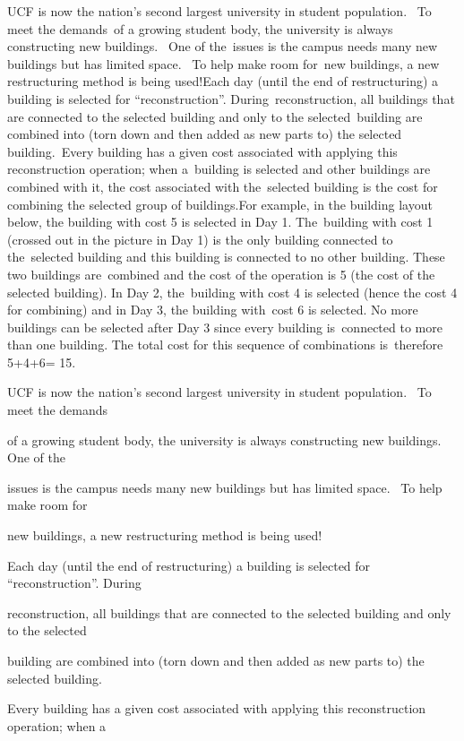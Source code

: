 UCF is now the nation’s second largest university in student population.  To meet the demands of a growing student body, the university is always constructing new buildings.  One of the issues is the campus needs many new buildings but has limited space.  To help make room for new buildings, a new restructuring method is being used!Each day (until the end of restructuring) a building is selected for “reconstruction”. During reconstruction, all buildings that are connected to the selected building and only to the selected building are combined into (torn down and then added as new parts to) the selected building. Every building has a given cost associated with applying this reconstruction operation; when a building is selected and other buildings are combined with it, the cost associated with the selected building is the cost for combining the selected group of buildings.For example, in the building layout below, the building with cost 5 is selected in Day 1. The building with cost 1 (crossed out in the picture in Day 1) is the only building connected to the selected building and this building is connected to no other building. These two buildings are combined and the cost of the operation is 5 (the cost of the selected building). In Day 2, the building with cost 4 is selected (hence the cost 4 for combining) and in Day 3, the building with cost 6 is selected. No more buildings can be selected after Day 3 since every building is connected to more than one building. The total cost for this sequence of combinations is therefore 5+4+6= 15.

UCF is now the nation’s second largest university in student population.  To meet the demands 

of a growing student body, the university is always constructing new buildings.  One of the 

issues is the campus needs many new buildings but has limited space.  To help make room for 

new buildings, a new restructuring method is being used!

Each day (until the end of restructuring) a building is selected for “reconstruction”. During 

reconstruction, all buildings that are connected to the selected building and only to the selected 

building are combined into (torn down and then added as new parts to) the selected building. 

Every building has a given cost associated with applying this reconstruction operation; when a 

